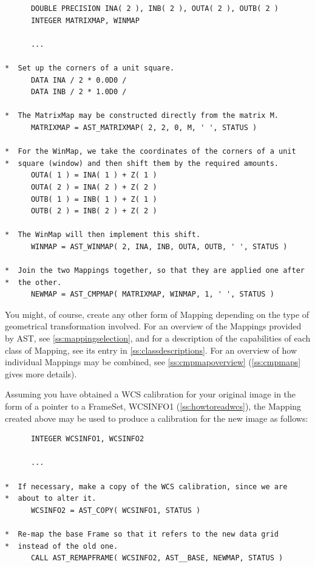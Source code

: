 \documentclass[twoside,11pt]{article}
\newcommand{\htmlref}[2]{#1}
\newcommand{\appref}[1]{Appendix~\ref{#1}}
\newcommand{\secref}[1]{\S\ref{#1}}
\renewcommand{\appref}[1]{\ref{#1}}
\renewcommand{\secref}[1]{\ref{#1}}
\begin{document}
\small
\begin{verbatim}
      DOUBLE PRECISION INA( 2 ), INB( 2 ), OUTA( 2 ), OUTB( 2 )
      INTEGER MATRIXMAP, WINMAP

      ...

*  Set up the corners of a unit square.
      DATA INA / 2 * 0.0D0 /
      DATA INB / 2 * 1.0D0 /

*  The MatrixMap may be constructed directly from the matrix M.
      MATRIXMAP = AST_MATRIXMAP( 2, 2, 0, M, ' ', STATUS )

*  For the WinMap, we take the coordinates of the corners of a unit
*  square (window) and then shift them by the required amounts.
      OUTA( 1 ) = INA( 1 ) + Z( 1 )
      OUTA( 2 ) = INA( 2 ) + Z( 2 )
      OUTB( 1 ) = INB( 1 ) + Z( 1 )
      OUTB( 2 ) = INB( 2 ) + Z( 2 )

*  The WinMap will then implement this shift.
      WINMAP = AST_WINMAP( 2, INA, INB, OUTA, OUTB, ' ', STATUS )

*  Join the two Mappings together, so that they are applied one after
*  the other.
      NEWMAP = AST_CMPMAP( MATRIXMAP, WINMAP, 1, ' ', STATUS )
\end{verbatim}
\normalsize

You might, of course, create any other form of Mapping depending on
the type of geometrical transformation involved. For an overview of
the Mappings provided by AST, see \secref{ss:mappingselection}, and
for a description of the capabilities of each class of Mapping, see
its entry in \appref{ss:classdescriptions}. For an overview of how
individual Mappings may be combined, see \secref{ss:cmpmapoverview}
(\secref{ss:cmpmaps} gives more details).

Assuming you have obtained a WCS calibration for your original image
in the form of a pointer to a \htmlref{FrameSet}{FrameSet}, WCSINFO1
(\secref{ss:howtoreadwcs}), the Mapping created above may be used to
produce a calibration for the new image as follows:

\small
\begin{verbatim}
      INTEGER WCSINFO1, WCSINFO2

      ...

*  If necessary, make a copy of the WCS calibration, since we are
*  about to alter it.
      WCSINFO2 = AST_COPY( WCSINFO1, STATUS )

*  Re-map the base Frame so that it refers to the new data grid
*  instead of the old one.
      CALL AST_REMAPFRAME( WCSINFO2, AST__BASE, NEWMAP, STATUS )
\end{verbatim}
\normalsize
\end{document}
